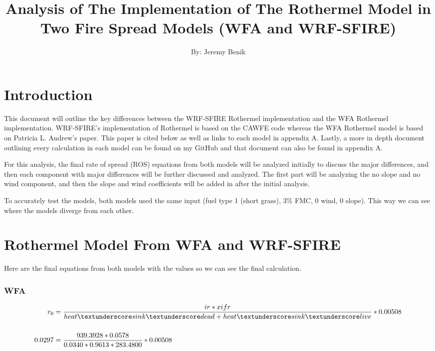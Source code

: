 \documentclass{article}
\newcommand\und{\textunderscore}
\begin{document}
\title{Analysis of The Implementation of The Rothermel Model in Two Fire Spread Models (WFA and WRF-SFIRE)}
\author{By: Jeremy Benik}
\maketitle
\section{Introduction}
	This document will outline the key differences between the WRF-SFIRE Rothermel implementation and the WFA Rothermel implementation. WRF-SFIRE's implementation of Rothermel is based on the CAWFE code whereas the WFA Rothermel model is based on Patricia L. Andrew's paper. This paper is cited below as well as links to each model in appendix A. Lastly, a more in depth document outlining every calculation in each model can be found on my GitHub and that document can also be found in appendix A. 
	
	For this analysis, the final rate of spread (ROS) equations from both models will be analyzed initially to discuss the major differences, and then each component with major differences will be further discussed and analyzed. The first part will be analyzing the no slope and no wind component, and then the slope and wind coefficients will be added in after the initial analysis. 
	
	To accurately test the models, both models used the same input (fuel type 1 (short grass), 3\% FMC, 0 wind, 0 slope). This way we can see where the models diverge from each other. 
	
\section{Rothermel Model From WFA and WRF-SFIRE}

Here are the final equations from both models with the values so we can see the final calculation. 

\subsubsection*{WFA}
	\begin{equation}
	\label{r0_WFA_2}
	\begin{split}
	r_0 &= \frac{ir * xifr}{heat\und sink\und dead + heat\und sink\und live} * 0.00508 \\
	\\
	0.0297 &= \frac{939.3928 * 0.0578}{0.0340 * 0.9613 * 283.4800} * 0.00508
	\end{split}
\end{equation}
\end{document}
